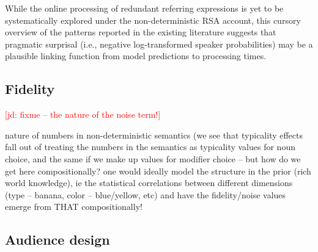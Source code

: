 \documentclass[11pt]{article}
\newcommand{\red}[1]{\textcolor{Red}{#1}}
\newcommand{\jd}[1]{\textcolor{Red}{[jd: #1]}}
\begin{document}
While the online processing of redundant referring expressions is yet to be systematically explored under the non-deterministic RSA account, this cursory overview of the patterns reported in the existing literature suggests that pragmatic surprisal (i.e., negative log-transformed speaker probabilities) may be a plausible linking function from model predictions to processing times.



%

\subsection{Fidelity}

\jd{fixme -- the nature of the noise term!}

nature of numbers in non-deterministic semantics (we see that typicality effects fall out of treating the numbers in the semantics as typicality values for noun choice, and the same if we make up values for modifier choice -- but how do we get here compositionally? one would ideally model the structure in the prior (rich world knowledge), ie the statistical correlations between different dimensions (type -- banana, color -- blue/yellow, etc) and have the fidelity/noise values emerge from THAT compositionally!

\subsection{Audience design}
\end{document}
